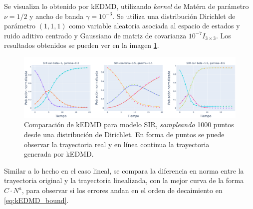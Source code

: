 Se visualiza lo obtenido por kEDMD, utilizando \textit{kernel} de Matérn de parámetro $\nu=1/2$ y ancho de banda $\gamma=10^{-3}$. Se utiliza una distribución Dirichlet de parámetro $(1,1,1)$ como variable aleatoria asociada al espacio de estados y ruido aditivo centrado y Gaussiano de matriz de covarianza $10^{-7} I_{3 \times 3}$. Los resultados obtenidos se pueden ver en la imagen \ref{fig:SIR_kEDMD}. \\
\begin{figure}[h]
    \centering
    \includegraphics[width=\linewidth]{img/content/chapter3/SIR.pdf}
    \caption{Comparación de kEDMD para modelo SIR, \textit{sampleando} 1000 puntos desde una distribución de Dirichlet. En forma de puntos se puede observar la trayectoria real y en línea continua la trayectoria generada por kEDMD.}
    \label{fig:SIR_kEDMD}
\end{figure}
Similar a lo hecho en el caso lineal, se compara la diferencia en norma entre la trayectoria original y la trayectoria linealizada, con la mejor curva de la forma $C \cdot N^{a}$, para observar si los errores andan en el orden de decaimiento en \eqref{eq:kEDMD_bound}.

